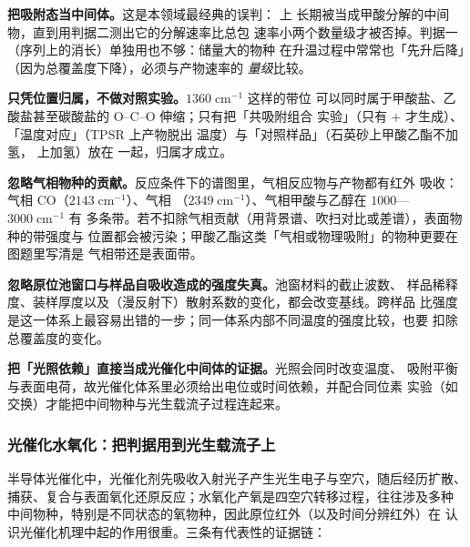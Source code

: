 \begin{pitfall}
\textbf{把吸附态当中间体。}这是本领域最经典的误判： 上
 长期被当成甲酸分解的中间物，直到用判据二测出它的分解速率比总包
速率小两个数量级才被否掉。判据一（序列上的消长）单独用也不够：储量大的物种
在升温过程中常常也「先升后降」（因为总覆盖度下降），必须与产物速率的
\emph{量级}比较。

\textbf{只凭位置归属，不做对照实验。}$1360\;\mathrm{cm^{-1}}$ 这样的带位
可以同时属于甲酸盐、乙酸盐甚至碳酸盐的 O--C--O 伸缩；只有把「共吸附组合
实验」（只有 $+$ 才生成）、「温度对应」（TPSR 上产物脱出
温度）与「对照样品」（石英砂上甲酸乙酯不加氢， 上加氢）放在
一起，归属才成立。

\textbf{忽略气相物种的贡献。}反应条件下的谱图里，气相反应物与产物都有红外
吸收：气相 CO（$2143\;\mathrm{cm^{-1}}$）、气相 （$2349\;
\mathrm{cm^{-1}}$）、气相甲酸与乙醇在 $1000$—$3000\;\mathrm{cm^{-1}}$ 有
多条带。若不扣除气相贡献（用背景谱、吹扫对比或差谱），表面物种的带强度与
位置都会被污染；甲酸乙酯这类「气相或物理吸附」的物种更要在图题里写清是
气相带还是表面带。

\textbf{忽略原位池窗口与样品自吸收造成的强度失真。}池窗材料的截止波数、
样品稀释度、装样厚度以及（漫反射下）散射系数的变化，都会改变基线。跨样品
比强度是这一体系上最容易出错的一步；同一体系内部不同温度的强度比较，也要
扣除总覆盖度的变化。

\textbf{把「光照依赖」直接当成光催化中间体的证据。}光照会同时改变温度、
吸附平衡与表面电荷，故光催化体系里必须给出电位或时间依赖，并配合同位素
实验（如  交换）才能把中间物种与光生载流子过程连起来。
\end{pitfall}

\subsubsection{光催化水氧化：把判据用到光生载流子上}

半导体光催化中，光催化剂先吸收入射光子产生光生电子与空穴，随后经历扩散、
捕获、复合与表面氧化还原反应；水氧化产氧是四空穴转移过程，往往涉及多种
中间物种，特别是不同状态的氧物种，因此原位红外（以及时间分辨红外）在
认识光催化机理中起的作用很重。三条有代表性的证据链：

